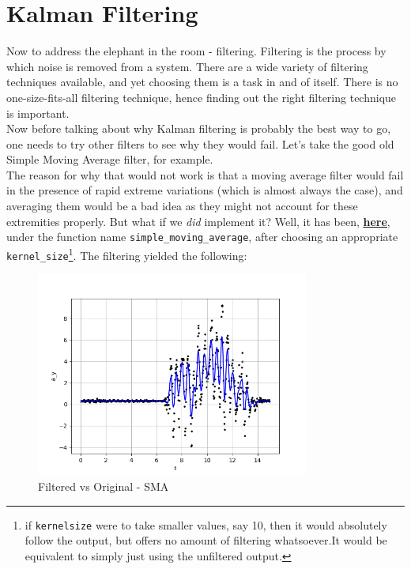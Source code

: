 \documentclass[oneside]{book}
\begin{document}
\chapter{Kalman Filtering}
Now to address the elephant in the room - filtering. Filtering is the process by which noise is removed from a system. There are a wide variety of filtering techniques available, and yet choosing them is a task in and of itself. There is no one-size-fits-all filtering technique, hence finding out the right filtering technique is important.\\ 
\bigskip
Now before talking about why Kalman filtering is probably the best way to go, one needs to try other filters to see why they would fail. Let's take the good old Simple Moving Average filter, for example. \\
The reason for why that would not work is that a moving average filter would fail in the presence of rapid extreme variations (which is almost always the case), and averaging them would be a bad idea as they might not account for these extremities properly.
But what if we \textit{did} implement it? Well, it has been, \href{https://github.com/HarryNyquist/Odometry/blob/main/Odometry_Bad_Tries/Bad_Filter_attempts.py}{\underline{\textbf{here}}}, under the function name \verb|simple_moving_average|, after choosing an appropriate \\ \verb|kernel_size|\footnote{if \texttt{kernel\textunderscore size} were to take smaller values, say 10, then it would absolutely follow the output, but offers no amount of filtering whatsoever.It would be equivalent to simply just using the unfiltered output.}. The filtering yielded the following:
\begin{figure}[htbp]
    \centering
    \includegraphics[width=0.8\textwidth]{figs/Filtered_using_SMA_downsampled.png}
    \caption{Filtered vs Original - SMA}
\end{figure}
\end{document}
